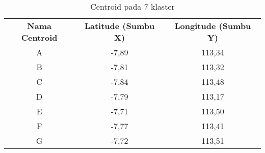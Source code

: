 \begin{table}[H]
\footnotesize
\centering
\begin{tabular}{ccc}
\rowcolor[HTML]{4472C4} 
{\color[HTML]{FFFFFF} \textbf{Nama   Centroid}} & {\color[HTML]{FFFFFF} \textbf{Latitude (Sumbu X)}} & {\color[HTML]{FFFFFF} \textbf{Longitude (Sumbu Y)}} \\
\rowcolor[HTML]{D9E1F2} 
A & -7,89 & 113,34 \\
B & -7,81 & 113,32 \\
\rowcolor[HTML]{D9E1F2} 
C & -7,84 & 113,48 \\
D & -7,79 & 113,17 \\
\rowcolor[HTML]{D9E1F2} 
E & -7,71 & 113,50 \\
F & -7,77 & 113,41 \\
\rowcolor[HTML]{D9E1F2} 
G & -7,72 & 113,51
\end{tabular}
\caption{Centroid pada 7 klaster}
\label{tab:center7}
\end{table}